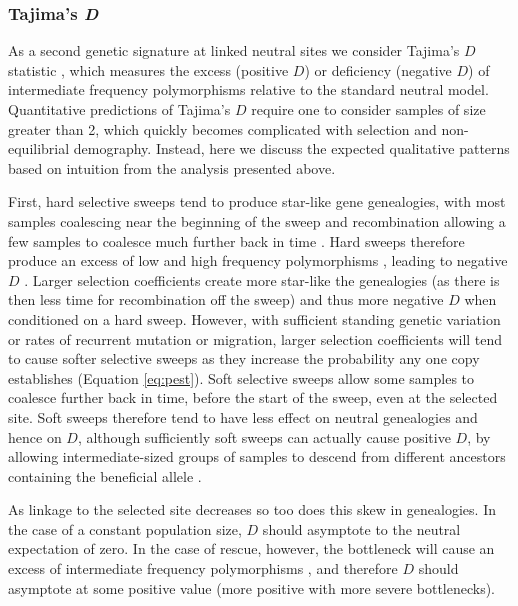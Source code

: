 \documentclass[]{article}
\begin{document}
\subsubsection*{Tajima's \textit{D}}
\label{sec:tajimasD}

As a second genetic signature at linked neutral sites we consider Tajima's $D$ statistic \citep{tajima1989statistical}, which measures the excess (positive $D$) or deficiency (negative $D$) of intermediate frequency polymorphisms relative to the standard neutral model. 
Quantitative predictions of Tajima's $D$ require one to consider samples of size greater than 2, which quickly becomes complicated with selection and non-equilibrial demography.
Instead, here we discuss the expected qualitative patterns based on intuition from the analysis presented above.

First, hard selective sweeps tend to produce star-like gene genealogies, with most samples coalescing near the beginning of the sweep and recombination allowing a few samples to coalesce much further back in time \citep{kaplan1989hitchhiking}.
Hard sweeps therefore produce an excess of low and high frequency polymorphisms \citep[][p.\ 120]{wakeley2009coalescent}, leading to negative $D$ \citep{braverman1995hitchhiking}.
Larger selection coefficients create more star-like the genealogies (as there is then less time for recombination off the sweep) and thus more negative $D$ when conditioned on a hard sweep.
However, with sufficient standing genetic variation or rates of recurrent mutation or migration, larger selection coefficients will tend to cause softer selective sweeps as they increase the probability any one copy establishes (Equation \ref{eq:pest}).
Soft selective sweeps allow some samples to coalesce further back in time, before the start of the sweep, even at the selected site.
Soft sweeps therefore tend to have less effect on neutral genealogies and hence on $D$, although sufficiently soft sweeps can actually cause positive $D$, by allowing intermediate-sized groups of samples to descend from different ancestors containing the beneficial allele \citep{pennings2006soft}.

As linkage to the selected site decreases so too does this skew in genealogies.
In the case of a constant population size, $D$ should asymptote to the neutral expectation of zero.
In the case of rescue, however, the bottleneck will cause an excess of intermediate frequency polymorphisms \citep[][p.\ 120]{wakeley2009coalescent}, and therefore $D$ should asymptote at some positive value (more positive with more severe bottlenecks).
\end{document}
